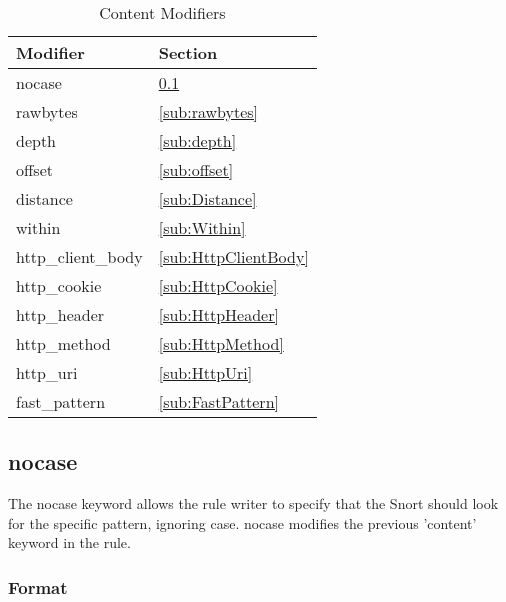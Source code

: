 \documentclass[english]{report}
\begin{document}
\begin{table}[h]
\begin{center}
\caption{Content Modifiers}
\label{Content Modifiers}
\begin{tabular}{|p{1in}|p{1in}|}

\hline 
Modifier & Section \\
\hline

\hline 
nocase & \ref{sub:nocase} \\

\hline
rawbytes & \ref{sub:rawbytes} \\

\hline
depth & \ref{sub:depth} \\

\hline 
offset & \ref{sub:offset} \\

\hline
distance & \ref{sub:Distance} \\

\hline 
within & \ref{sub:Within} \\

\hline
http\_client\_body & \ref{sub:HttpClientBody} \\

\hline 
http\_cookie & \ref{sub:HttpCookie} \\

\hline 
http\_header & \ref{sub:HttpHeader} \\

\hline 
http\_method & \ref{sub:HttpMethod} \\

\hline 
http\_uri & \ref{sub:HttpUri} \\

\hline
fast\_pattern & \ref{sub:FastPattern} \\

\hline
\end{tabular}
\end{center}
\end{table}

\subsection{nocase}
\label{sub:nocase}

The nocase keyword allows the rule writer to specify that the Snort should look
for the specific pattern, ignoring case.  nocase modifies the previous
'content' keyword in the rule.

\subsubsection{Format}
\end{document}
